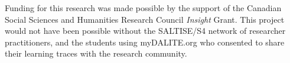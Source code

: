 \documentclass[sigconf]{acmart}
\begin{document}
\begin{acks}
Funding for this research was made possible by the support of the Canadian 
Social Sciences and Humanities Research Council \textit{Insight} Grant. This 
project would not have been possible without the SALTISE/S4 network of 
researcher practitioners, and the students using myDALITE.org who consented to 
share their learning traces with the research community.
\end{acks}







\end{document}
